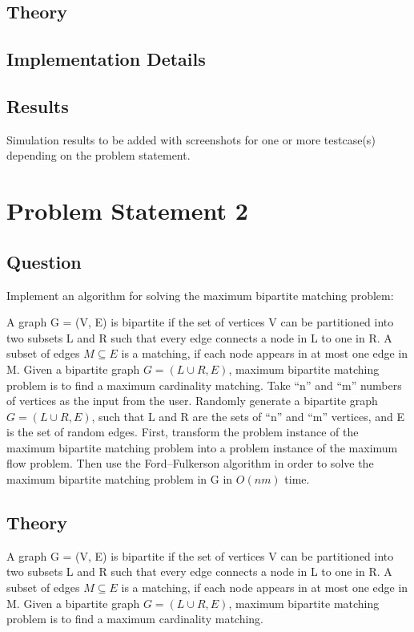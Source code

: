 \documentclass[11pt,a4paper]{article}
\begin{document}
\subsection{Theory}\label{sec:theory1}

\subsection{Implementation Details}\label{sec:details1}

\subsection{Results}\label{sec:results1}
Simulation results to be added with screenshots for one or more testcase(s) depending on the problem statement.

\clearpage
\section{Problem Statement 2}\label{sec:problem2}
\subsection{Question}\label{sec:question2}
Implement an algorithm for solving the maximum bipartite matching problem:

A graph G = (V, E) is bipartite if the set of vertices V can be partitioned into two subsets L and R such that every edge connects a node in L to one in R. A subset of edges $M \subseteq E$ is a matching, if each node appears in at most one edge in M. Given a bipartite graph $G = (L \cup R, E)$, maximum bipartite matching problem is to find a maximum cardinality matching. Take “n” and “m” numbers of vertices as the input from the user. Randomly generate a bipartite graph $G = (L \cup R, E)$, such that L and R are the sets of “n” and “m” vertices, and E is the set of random edges. First, transform the problem instance of the maximum bipartite matching problem into a problem instance of the maximum flow problem. Then use the Ford–Fulkerson algorithm in order to solve the maximum bipartite matching problem in G in $O(nm)$ time.
\subsection{Theory}\label{sec:theory2}
A graph G = (V, E) is bipartite if the set of vertices V can be partitioned into two subsets L and R such that every edge connects a node in L to one in R. A subset of edges $M \subseteq E$ is a matching, if each node appears in at most one edge in M. Given a bipartite graph $G = (L \cup R, E)$, maximum bipartite matching problem is to find a maximum cardinality matching.
\end{document}
